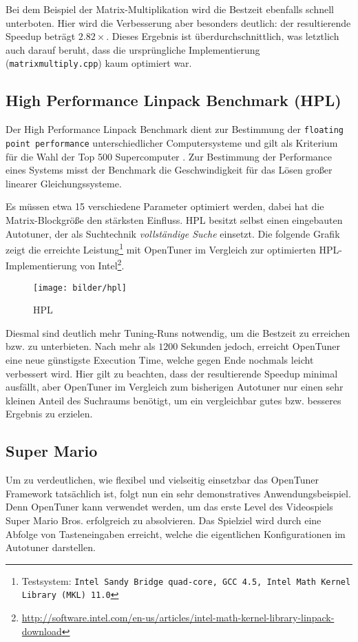 \documentclass[a4paper,11pt]{scrartcl}
\newcommand{\bzw}{\mbox{bzw.}\xspace}
\begin{document}
Bei dem Beispiel der Matrix-Multiplikation wird die Bestzeit ebenfalls schnell unterboten.
Hier wird die Verbesserung aber besonders deutlich: der resultierende Speedup beträgt
$2.82 \times$. Dieses Ergebnis ist überdurchschnittlich, was letztlich auch darauf beruht,
dass die ursprüngliche Implementierung (\texttt{matrixmultiply.cpp}) kaum optimiert war.

\subsection{High Performance Linpack Benchmark (HPL)}
Der High Performance Linpack Benchmark \cite{hpl} dient zur Bestimmung der 
\texttt{floating point performance} unterschiedlicher Computersysteme und gilt als 
Kriterium für die Wahl der Top 500 Supercomputer \cite{top500}.
Zur Bestimmung der Performance eines Systems misst der Benchmark die Geschwindigkeit 
für das Lösen großer linearer Gleichungssysteme. \newline

Es müssen etwa 15 verschiedene Parameter
optimiert werden, dabei hat die Matrix-Blockgröße den stärksten Einfluss.
HPL besitzt selbst einen eingebauten Autotuner, der als Suchtechnik 
\emph{vollständige Suche} einsetzt. Die folgende Grafik zeigt die erreichte Leistung\footnote{
Testsystem: \texttt{Intel Sandy Bridge quad-core, GCC 4.5, Intel  Math  Kernel  Library  (MKL)  11.0}}
mit OpenTuner im Vergleich zur optimierten HPL-Implementierung von Intel\footnote{\url{http://software.intel.com/en-us/articles/intel-math-kernel-library-linpack-download}}. \newline


\begin{figure}[h]
\begin{center}
\texttt{[image: bilder/hpl]}
\cite{OT-paper} \caption{HPL}
\end{center}
\end{figure}

Diesmal sind deutlich mehr Tuning-Runs notwendig, um die Bestzeit zu erreichen \bzw zu unterbieten.
Nach mehr als $1200$ Sekunden jedoch, erreicht OpenTuner eine neue günstigste Execution Time,
welche gegen Ende nochmals leicht verbessert wird. Hier gilt zu beachten, dass der resultierende
Speedup minimal ausfällt, aber OpenTuner im Vergleich zum bisherigen Autotuner nur einen 
sehr kleinen Anteil des Suchraums benötigt, um ein vergleichbar gutes \bzw besseres Ergebnis 
zu erzielen.

\subsection{Super Mario}
Um zu verdeutlichen, wie flexibel und vielseitig einsetzbar das OpenTuner Framework tatsächlich ist,
folgt nun ein sehr demonstratives Anwendungsbeispiel. Denn OpenTuner kann verwendet werden,
um das erste Level des Videospiels Super Mario Bros. erfolgreich zu absolvieren.
Das Spielziel wird durch eine Abfolge von Tasteneingaben erreicht, welche die eigentlichen
Konfigurationen im Autotuner darstellen. \newline
\end{document}
